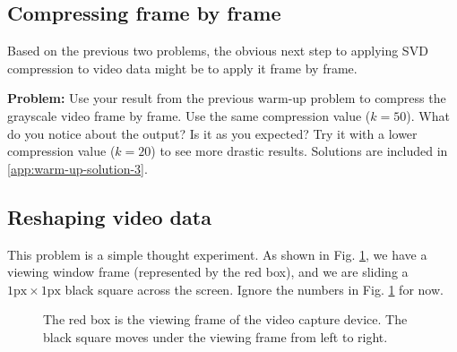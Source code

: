 \subsection{Compressing frame by frame}
Based on the previous two problems, the obvious next step to applying SVD compression to video data might be to apply it frame by frame.

\textbf{Problem:} Use your result from the previous warm-up problem to compress the grayscale video frame by frame. Use the same compression value ($k = 50$). What do you notice about the output? Is it as you expected? Try it with a lower compression value ($k = 20$) to see more drastic results. Solutions are included in \ref{app:warm-up-solution-3}.

\subsection{Reshaping video data}
This problem is a simple thought experiment. As shown in Fig. \ref{fig:warm-up-4-experiment}, we have a viewing window frame (represented by the red box), and we are sliding a $1\text{px} \times 1\text{px}$ black square across the screen. Ignore the numbers in Fig. \ref{fig:warm-up-4-experiment} for now.
\begin{figure}[ht]
	\centering
	\caption{The red box is the viewing frame of the video capture device. The black square moves under the viewing frame from left to right.}
	\label{fig:warm-up-4-experiment}
\end{figure}

